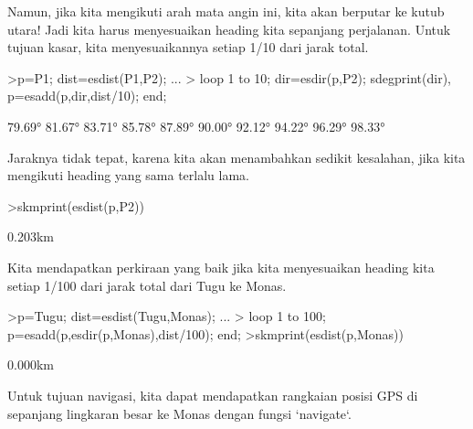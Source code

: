 \documentclass[12pt,arial,letterpaper]{book}
\begin{document}
\begin{eulercomment}
\begin{eulercomment}
\begin{eulercomment}
\begin{eulercomment}
\begin{eulercomment}
\begin{eulercomment}
\begin{eulercomment}
\begin{eulercomment}
\begin{eulercomment}
\begin{eulercomment}
\begin{eulercomment}
\begin{eulercomment}
\begin{eulercomment}
\begin{eulercomment}
\begin{eulercomment}
\begin{eulercomment}
\begin{eulercomment}
\begin{eulercomment}
\begin{eulercomment}
\begin{eulercomment}
\begin{eulercomment}
\begin{eulercomment}
\begin{eulercomment}
\begin{eulercomment}
\begin{eulercomment}
\begin{eulercomment}
\begin{eulercomment}
\begin{eulercomment}
\begin{eulercomment}
\begin{eulercomment}
\begin{eulercomment}
Namun, jika kita mengikuti arah mata angin ini, kita akan berputar ke
kutub utara! Jadi kita harus menyesuaikan heading kita sepanjang
perjalanan. Untuk tujuan kasar, kita menyesuaikannya setiap 1/10 dari
jarak total.
\end{eulercomment}
\begin{eulerprompt}
>p=P1;  dist=esdist(P1,P2); ...
>  loop 1 to 10; dir=esdir(p,P2); sdegprint(dir), p=esadd(p,dir,dist/10); end;
\end{eulerprompt}
\begin{euleroutput}
       79.69°
       81.67°
       83.71°
       85.78°
       87.89°
       90.00°
       92.12°
       94.22°
       96.29°
       98.33°
\end{euleroutput}
\begin{eulercomment}
Jaraknya tidak tepat, karena kita akan menambahkan sedikit kesalahan,
jika kita mengikuti heading yang sama terlalu lama.
\end{eulercomment}
\begin{eulerprompt}
>skmprint(esdist(p,P2))
\end{eulerprompt}
\begin{euleroutput}
       0.203km
\end{euleroutput}
\begin{eulercomment}
Kita mendapatkan perkiraan yang baik jika kita menyesuaikan heading
kita setiap 1/100 dari jarak total dari Tugu ke Monas.
\end{eulercomment}
\begin{eulerprompt}
>p=Tugu; dist=esdist(Tugu,Monas); ...
>  loop 1 to 100; p=esadd(p,esdir(p,Monas),dist/100); end;
>skmprint(esdist(p,Monas))
\end{eulerprompt}
\begin{euleroutput}
       0.000km
\end{euleroutput}
\begin{eulercomment}
Untuk tujuan navigasi, kita dapat mendapatkan rangkaian posisi GPS di
sepanjang lingkaran besar ke Monas dengan fungsi `navigate`.

\end{eulercomment}
\end{eulercomment}
\end{eulercomment}
\end{eulercomment}
\end{eulercomment}
\end{eulercomment}
\end{eulercomment}
\end{eulercomment}
\end{eulercomment}
\end{eulercomment}
\end{eulercomment}
\end{eulercomment}
\end{eulercomment}
\end{eulercomment}
\end{eulercomment}
\end{eulercomment}
\end{eulercomment}
\end{eulercomment}
\end{eulercomment}
\end{eulercomment}
\end{eulercomment}
\end{eulercomment}
\end{eulercomment}
\end{eulercomment}
\end{eulercomment}
\end{eulercomment}
\end{eulercomment}
\end{eulercomment}
\end{eulercomment}
\end{eulercomment}
\end{eulercomment}
\end{document}
